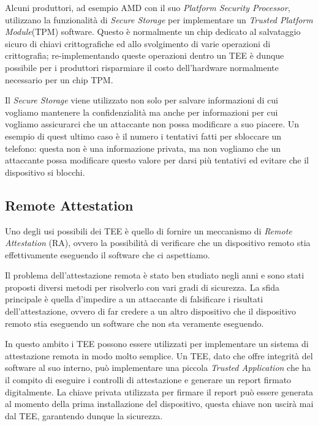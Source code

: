 \documentclass[12pt,italian]{report}
\begin{document}
Alcuni produttori, ad esempio AMD con il suo
\textit{Platform Security Processor}, utilizzano la
funzionalità di \textit{Secure Storage} per implementare un
\textit{Trusted Platform Module}(TPM) software\cite{amd2020ftpm}.
Questo è normalmente un chip dedicato al salvataggio sicuro di chiavi crittografiche
ed allo svolgimento di varie operazioni di crittografia; re-implementando
queste operazioni dentro un TEE è dunque possibile per i produttori risparmiare
il costo dell'hardware normalmente necessario per un chip TPM.

Il \textit{Secure Storage} viene utilizzato non solo per salvare
informazioni di cui vogliamo mantenere la confidenzialità ma anche per
informazioni per cui vogliamo assicurarci che un attaccante non possa
modificare a suo piacere.
Un esempio di quest ultimo caso è il numero i tentativi fatti per sbloccare
un telefono: questa non è una informazione privata, ma non vogliamo che un
attaccante possa modificare questo valore per darsi più tentativi ed evitare
che il dispositivo si blocchi.


\subsection{Remote Attestation}
\label{subsec:remote-attestation}
Uno degli usi possibili dei TEE è quello di fornire un meccanismo di
\textit{Remote Attestation} (RA), ovvero la possibilità di verificare che
un dispositivo remoto stia effettivamente eseguendo il software che
ci aspettiamo.

Il problema dell'attestazione remota è stato ben studiato negli anni e
sono stati proposti diversi metodi per risolverlo con vari gradi di
sicurezza.
La sfida principale è quella d'impedire a un attaccante di falsificare
i risultati dell'attestazione, ovvero di far credere a un altro dispositivo
che il dispositivo remoto stia eseguendo un software che non sta veramente
eseguendo.

In questo ambito i TEE possono essere utilizzati per implementare un sistema
di attestazione remota in modo molto semplice.
Un TEE, dato che offre integrità del software al suo interno, può implementare
una piccola \textit{Trusted Application} che ha il compito di eseguire
i controlli di attestazione e generare un report firmato digitalmente.
La chiave privata utilizzata per firmare il report può essere generata al
momento della prima installazione del dispositivo, questa chiave non uscirà
mai dal TEE, garantendo dunque la sicurezza.
\end{document}
